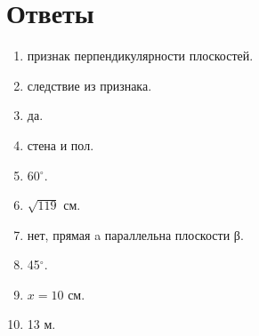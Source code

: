 \documentclass{umk-matematika}
\begin{document}
\newpage
\section*{Ответы}

\begin{enumerate}
  \item признак перпендикулярности плоскостей.
  \item следствие из признака.
  \item да.
  \item стена и пол.
  \item 60$^\circ$.
  \item $\sqrt{119}$ см.
  \item нет, прямая a параллельна плоскости β.
  \item 45$^\circ$.
  \item $x = 10$ см.
  \item 13 м.
\end{enumerate}
\end{document}
